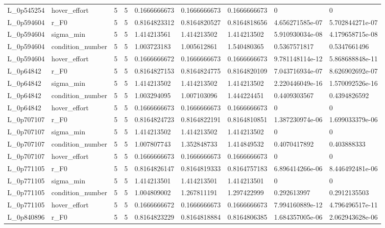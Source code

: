 \begin{tabular}{@{}lllllllll@{}}
L\_0p545254 & hover\_effort & 5 & 5 & 0.1666666673 & 0.1666666673 & 0.1666666673 & 0 & 0 \\
L\_0p594604 & r\_F0 & 5 & 5 & 0.8164823312 & 0.8164820527 & 0.8164818656 & 4.656271585e-07 & 5.702844271e-07 \\
L\_0p594604 & sigma\_min & 5 & 5 & 1.414213561 & 1.414213502 & 1.414213502 & 5.910930034e-08 & 4.179658715e-08 \\
L\_0p594604 & condition\_number & 5 & 5 & 1.003723183 & 1.005612861 & 1.540480365 & 0.5367571817 & 0.5347661496 \\
L\_0p594604 & hover\_effort & 5 & 5 & 0.1666666672 & 0.1666666673 & 0.1666666673 & 9.781148114e-12 & 5.868688848e-11 \\
L\_0p64842 & r\_F0 & 5 & 5 & 0.8164827153 & 0.8164824775 & 0.8164820109 & 7.043716934e-07 & 8.626902692e-07 \\
L\_0p64842 & sigma\_min & 5 & 5 & 1.414213502 & 1.414213502 & 1.414213502 & 2.220446049e-16 & 1.570092526e-16 \\
L\_0p64842 & condition\_number & 5 & 5 & 1.003294095 & 1.007103096 & 1.444224451 & 0.4409303567 & 0.4394826592 \\
L\_0p64842 & hover\_effort & 5 & 5 & 0.1666666673 & 0.1666666673 & 0.1666666673 & 0 & 0 \\
L\_0p707107 & r\_F0 & 5 & 5 & 0.8164824723 & 0.8164822191 & 0.8164810851 & 1.387230974e-06 & 1.699033379e-06 \\
L\_0p707107 & sigma\_min & 5 & 5 & 1.414213502 & 1.414213502 & 1.414213502 & 0 & 0 \\
L\_0p707107 & condition\_number & 5 & 5 & 1.007807743 & 1.352848733 & 1.414849532 & 0.4070417892 & 0.403888333 \\
L\_0p707107 & hover\_effort & 5 & 5 & 0.1666666673 & 0.1666666673 & 0.1666666673 & 0 & 0 \\
L\_0p771105 & r\_F0 & 5 & 5 & 0.8164826147 & 0.8164819333 & 0.8164757183 & 6.896414266e-06 & 8.446492481e-06 \\
L\_0p771105 & sigma\_min & 5 & 5 & 1.414213501 & 1.414213501 & 1.414213501 & 0 & 0 \\
L\_0p771105 & condition\_number & 5 & 5 & 1.004809002 & 1.267811191 & 1.297422999 & 0.292613997 & 0.2912135503 \\
L\_0p771105 & hover\_effort & 5 & 5 & 0.1666666672 & 0.1666666673 & 0.1666666673 & 7.994160889e-12 & 4.796496517e-11 \\
L\_0p840896 & r\_F0 & 5 & 5 & 0.8164823229 & 0.8164818884 & 0.8164806385 & 1.684357005e-06 & 2.062943628e-06 \\

\end{tabular}
